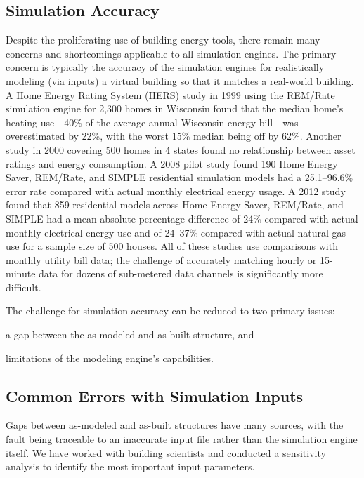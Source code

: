 \documentclass[preprint, review, 12pt]{elsarticle}
\begin{document}
\subsection{Simulation Accuracy}
Despite the proliferating use of building energy tools, there remain many concerns and shortcomings applicable to all simulation engines. The primary concern is typically the accuracy of the simulation engines for realistically modeling (via inputs) a virtual building so that it matches a real-world building. A Home Energy Rating System (HERS) study in 1999 \cite{cit:pigg2001} using the REM/Rate
simulation engine for 2,300 homes in Wisconsin found that the median home's heating use---40\% of the average annual Wisconsin energy bill---was overestimated by 22\%, with the worst 15\% median being off by 62\%. Another study in 2000 \cite{Stein2000339} covering 500 homes in 4 states found no relationship between asset ratings and energy consumption. A 2008 pilot study \cite{cit:earthadvantage2009} found 190 Home Energy Saver, REM/Rate, and SIMPLE residential simulation models had a 25.1--96.6\% error rate compared with actual monthly electrical energy usage. A 2012 study \cite{cit:roberts2012} found that 859 residential models across Home Energy Saver, REM/Rate, and SIMPLE had a mean absolute percentage difference of 24\% compared with actual monthly electrical energy use and of 24--37\% compared with actual natural gas use for a sample size of 500 houses. All of these studies use comparisons with monthly utility bill data; the challenge of accurately matching hourly or 15-minute data for dozens of sub-metered data channels is significantly more difficult.

The challenge for simulation accuracy can be reduced to two primary issues: \begin{inparaenum}[(1)]
\item a gap between the as-modeled and as-built structure, and 
\item limitations of the modeling engine's capabilities.
\end{inparaenum}

\subsection{Common Errors with Simulation Inputs}
Gaps between as-modeled and as-built structures have many sources, with the fault being traceable to an inaccurate input file rather than the simulation engine itself. We have worked with building scientists and conducted a sensitivity analysis to identify the most important input parameters.
\end{document}
